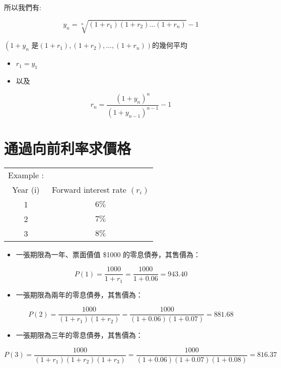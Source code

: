 \documentclass[letterpaper]{article}
\begin{document}
所以我們有:

$$
y_{n}=\sqrt[n]{\left(1+r_{1}\right)\left(1+r_{2}\right) \ldots\left(1+r_{n}\right)}-1
$$

$\left(1+y_{n}\right.$ 是$\left.\left(1+r_{1}\right),\left(1+r_{2}\right), \ldots,\left(1+r_{n}\right)\right)$的幾何平均 


\begin{itemize}
  \item $r_{1}=y_{1}$
  \item 以及
\end{itemize}

$$
r_{n}=\frac{\left(1+y_{n}\right)^{n}}{\left(1+y_{n-1}\right)^{n-1}}-1
$$

\section*{通過向前利率求價格}

\begin{center}
\begin{tabular}{cc}
Example : &  \\
Year (i) & Forward interest rate $\left(r_{i}\right)$ \\
\hline
1 & $6 \%$ \\
2 & $7 \%$ \\
3 & $8 \%$ \\
\end{tabular}
\end{center}


\begin{itemize}
	\item 一張期限為一年、票面價值 \$1000 的零息債券，其售價為：
\end{itemize}

$$
P(1)=\frac{1000}{1+r_{1}}=\frac{1000}{1+0.06}=943.40
$$

\begin{itemize}
	\item 一張期限為兩年的零息債券，其售價為：
\end{itemize}

$$
P(2)=\frac{1000}{\left(1+r_{1}\right)\left(1+r_{2}\right)}=\frac{1000}{(1+0.06)(1+0.07)}=881.68
$$

\begin{itemize}
  \item 一張期限為三年的零息債券，其售價為：
\end{itemize}

$$
P(3)=\frac{1000}{\left(1+r_{1}\right)\left(1+r_{2}\right)\left(1+r_{3}\right)}=\frac{1000}{(1+0.06)(1+0.07)(1+0.08)}=816.37
$$
\end{document}
